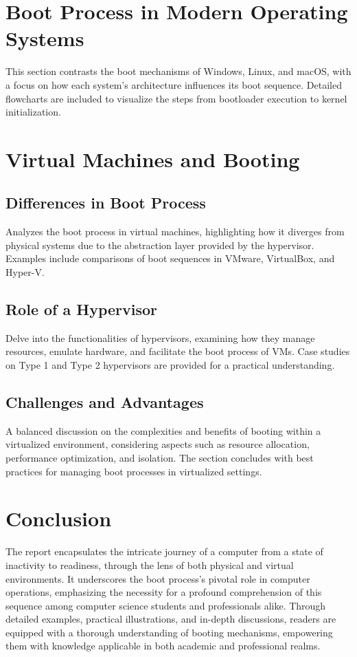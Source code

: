 \documentclass[12pt]{article}
\begin{document}
\section{Boot Process in Modern Operating Systems}
This section contrasts the boot mechanisms of Windows, Linux, and macOS, with a focus on how each system's architecture influences its boot sequence. Detailed flowcharts are included to visualize the steps from bootloader execution to kernel initialization.

\section{Virtual Machines and Booting}
\subsection{Differences in Boot Process}
Analyzes the boot process in virtual machines, highlighting how it diverges from physical systems due to the abstraction layer provided by the hypervisor. Examples include comparisons of boot sequences in VMware, VirtualBox, and Hyper-V.

\subsection{Role of a Hypervisor}
Delve into the functionalities of hypervisors, examining how they manage resources, emulate hardware, and facilitate the boot process of VMs. Case studies on Type 1 and Type 2 hypervisors are provided for a practical understanding.

\subsection{Challenges and Advantages}
A balanced discussion on the complexities and benefits of booting within a virtualized environment, considering aspects such as resource allocation, performance optimization, and isolation. The section concludes with best practices for managing boot processes in virtualized settings.

\section{Conclusion}
The report encapsulates the intricate journey of a computer from a state of inactivity to readiness, through the lens of both physical and virtual environments. It underscores the boot process's pivotal role in computer operations, emphasizing the necessity for a profound comprehension of this sequence among computer science students and professionals alike. Through detailed examples, practical illustrations, and in-depth discussions, readers are equipped with a thorough understanding of booting mechanisms, empowering them with knowledge applicable in both academic and professional realms.
\end{document}
